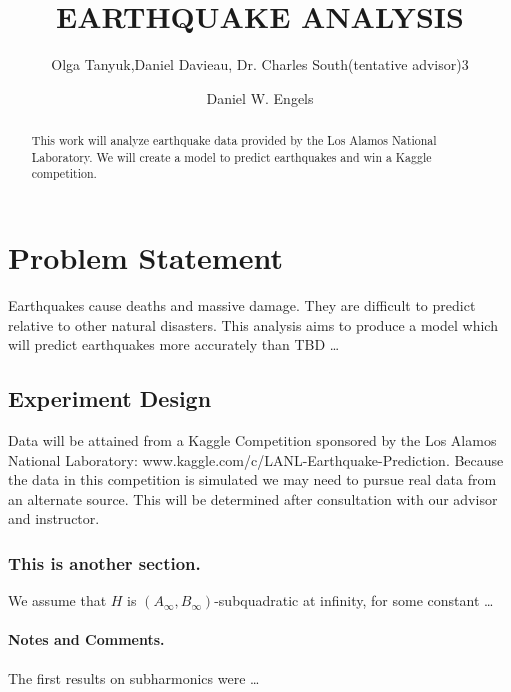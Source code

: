 \documentclass[]{llncs}
\title{EARTHQUAKE ANALYSIS}
\author{Olga Tanyuk\inst{1},Daniel Davieau\inst{2}, Dr. Charles South(tentative advisor){3} \and Daniel W. Engels}
\institute{Southern Methodist University, Dallas TX 75205, USA}
\begin{document}
\maketitle
%
\begin{abstract}
This work will analyze earthquake data provided by the Los Alamos National Laboratory. We will create a model to predict earthquakes and win a Kaggle competition.
\end{abstract}
%
\section{Problem Statement}
%
Earthquakes cause deaths and massive damage. They are difficult to predict relative to other natural disasters. This analysis aims to produce a model which will predict earthquakes more accurately than TBD   \dots
%
\subsection{Experiment Design}
%
Data will be attained from a Kaggle Competition sponsored by the Los Alamos National Laboratory:  www.kaggle.com/c/LANL-Earthquake-Prediction. Because the data in this competition is simulated we may need to pursue real data from an alternate source. This will be determined after consultation with our advisor and instructor.
%
\subsubsection*{This is another section.}
%
We assume that $H$ is $\left(A_{\infty}, B_{\infty}\right)$-subqua\-dra\-tic at infinity, for some constant \dots
%
\paragraph{Notes and Comments.} The first results on subharmonics were \dots
%
\end{document}

